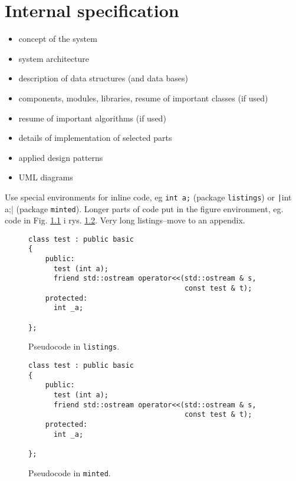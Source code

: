 \chapter{Internal specification}

\begin{itemize}
\item concept of the system
\item system architecture
\item description of data structures (and data bases)
\item components, modules, libraries, resume of important classes (if used)
\item resume of important algorithms (if used)
\item details of implementation of selected parts
\item applied design patterns
\item UML diagrams
\end{itemize}

Use special environments for inline code, eg  \lstinline|int a;| (package \texttt{listings}) or  \texttt|int a;| (package \texttt{minted}). 
Longer parts of code put in the figure environment, eg. code in Fig. \ref{fig:pseudocode:listings} i rys. \ref{fig:pseudocode:minted}. Very long listings–move to an appendix.


\clearpage
\begin{figure}
\centering
\begin{lstlisting}
class test : public basic
{
    public:
      test (int a);
      friend std::ostream operator<<(std::ostream & s, 
                                     const test & t);
    protected:
      int _a;  
      
};
\end{lstlisting}
\caption{Pseudocode in \texttt{listings}.}
\label{fig:pseudocode:listings}
\end{figure}

\begin{figure}
\centering
\begin{verbatim}
class test : public basic
{
    public:
      test (int a);
      friend std::ostream operator<<(std::ostream & s, 
                                     const test & t);
    protected:
      int _a;  
      
};
\end{verbatim}
\caption{Pseudocode in \texttt{minted}.}
\label{fig:pseudocode:minted}
\end{figure}


